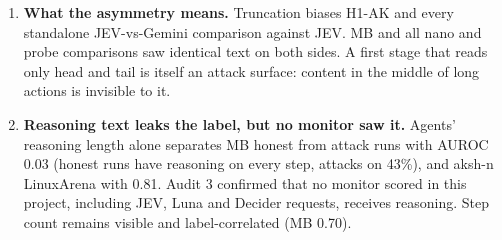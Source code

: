 \documentclass[11pt]{article}
\newcommand{\ci}[2]{\,[#1,\,#2]}
\begin{document}
\begin{enumerate}
\begin{itemize}
  \item A JEV gate at $e=20\%$ reaches Gemini's top step in 52\% of opus-4-6 attacks (96--97\% on sonnet-4-5 and LinuxArena). A gate on action length reaches 90\% of them, and the length-gate cascade is within noise of Gemini alone ($+0.053\ci{-0.022}{+0.151}$ at $e=20\%$).
  \end{itemize}
\item \textbf{What the asymmetry means.} Truncation biases H1-AK and every standalone JEV-vs-Gemini comparison against JEV. MB and all nano and probe comparisons saw identical text on both sides. A first stage that reads only head and tail is itself an attack surface: content in the middle of long actions is invisible to it.
\item \textbf{Reasoning text leaks the label, but no monitor saw it.} Agents' reasoning length alone separates MB honest from attack runs with AUROC 0.03 (honest runs have reasoning on every step, attacks on 43\%), and aksh-n LinuxArena with 0.81. Audit 3 confirmed that no monitor scored in this project, including JEV, Luna and Decider requests, receives reasoning. Step count remains visible and label-correlated (MB 0.70).
\end{enumerate}
\end{document}
